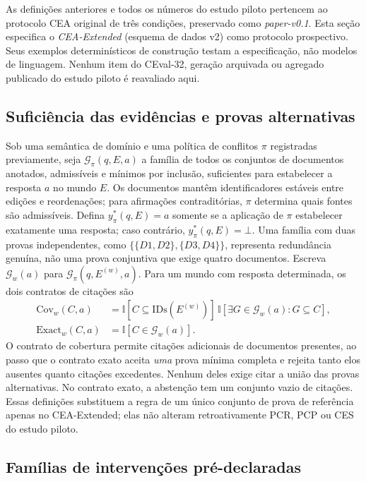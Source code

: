 \documentclass[10pt,twocolumn]{article}
\newcommand{\ind}{\mathbb{I}}
\newcommand{\botans}{\bot}
\begin{document}
As definições anteriores e todos os números do estudo piloto pertencem ao protocolo CEA original de três condições, preservado como \emph{paper-v0.1}. Esta seção especifica o \emph{CEA-Extended} (esquema de dados v2) como protocolo prospectivo. Seus exemplos determinísticos de construção testam a especificação, não modelos de linguagem. Nenhum item do CEval-32, geração arquivada ou agregado publicado do estudo piloto é reavaliado aqui.

\subsection{Suficiência das evidências e provas alternativas}

Sob uma semântica de domínio e uma política de conflitos $\pi$ registradas
previamente, seja $\mathcal{G}_{\pi}(q,E,a)$ a família de todos os conjuntos
de documentos anotados, admissíveis e mínimos por inclusão, suficientes
para estabelecer a resposta $a$ no mundo $E$. Os documentos mantêm
identificadores estáveis entre edições e reordenações; para afirmações
contraditórias, $\pi$ determina quais fontes são admissíveis. Defina
$y^*_{\pi}(q,E)=a$ somente se a aplicação de $\pi$ estabelecer exatamente
uma resposta; caso contrário, $y^*_{\pi}(q,E)=\botans$. Uma família com duas
provas independentes, como $\{\{D1,D2\},\{D3,D4\}\}$, representa redundância
genuína, não uma prova conjuntiva que exige quatro documentos. Escreva
$\mathcal{G}_w(a)$ para $\mathcal{G}_{\pi}(q,E^{(w)},a)$. Para um mundo com
resposta determinada, os dois contratos de citações são
\begin{align}
\mathrm{Cov}_{w}(C,a)
 &= \ind[C\subseteq\mathrm{IDs}(E^{(w)})]\,
    \ind[\exists G\in\mathcal{G}_w(a):G\subseteq C],\\
\mathrm{Exact}_{w}(C,a)
 &= \ind[C\in\mathcal{G}_w(a)].
\end{align}
O contrato de cobertura permite citações adicionais de documentos presentes,
ao passo que o contrato exato aceita \emph{uma} prova mínima completa e rejeita
tanto elos ausentes quanto citações excedentes. Nenhum deles exige citar a
união das provas alternativas. No contrato exato, a abstenção tem um conjunto
vazio de citações. Essas definições substituem a regra de um único conjunto
de prova de referência apenas no CEA-Extended; elas não alteram
retroativamente PCR, PCP ou CES do estudo piloto.

\subsection{Famílias de intervenções pré-declaradas}
\end{document}
